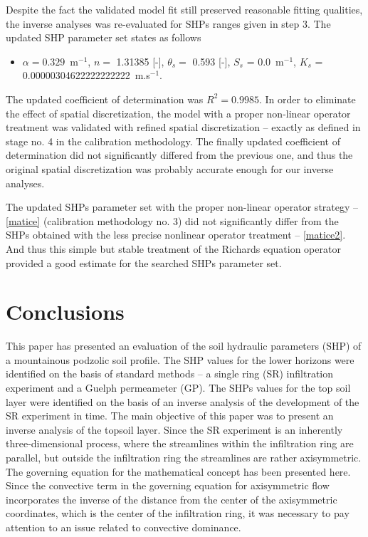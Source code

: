 \documentclass[review]{myarticle}
\begin{document}
Despite the fact the validated model fit still preserved reasonable fitting qualities, the inverse analyses was re-evaluated for SHPs ranges given in step 3. The updated SHP parameter set states as follows
\begin{itemize}
\item  $\alpha= 0.329$~m$^{-1}$, $n=$            1.31385 [-],  $\theta_s=$  0.593 [-], $S_s$ = 0.0~m$^{-1}$, $K_s$ = \num{.00000304622222222222}~m.s$^{-1}$.
\end{itemize}
The updated coefficient of determination was $R^2=0.9985$. In order to eliminate the effect of spatial discretization, the model with a proper non-linear operator treatment was validated with refined spatial discretization -- exactly as defined in stage no. 4 in the calibration methodology. The finally updated coefficient of determination did not significantly differed from the previous one, and thus the original spatial discretization was probably accurate enough for our inverse analyses.

The updated SHPs parameter set with the proper non-linear operator strategy  -- \eqref{matice} (calibration methodology no. 3)  did not significantly differ from the SHPs obtained with the less precise nonlinear operator treatment -- \eqref{matice2}. And thus this simple but  stable treatment  of the Richards equation operator provided a good estimate for the searched SHPs parameter set.

\section{Conclusions} %

This paper has presented an evaluation of the soil hydraulic parameters (SHP) of a mountainous podzolic soil profile. The SHP values for the lower horizons were identified on the basis of standard methods -- a single ring (SR) infiltration experiment and a Guelph permeameter (GP). The SHPs values for the top soil layer were identified on the basis of an inverse analysis of the development of the SR experiment in time. The main objective of this paper was to present an inverse analysis of the topsoil layer.  Since the SR experiment is an inherently three-dimensional process, where the streamlines within the infiltration ring are parallel, but outside the infiltration ring the streamlines are rather axisymmetric. The governing equation for the mathematical concept has been presented here. Since the convective term in the governing equation for axisymmetric flow incorporates the inverse of the distance from the center of the axisymmetric coordinates, which is the center of the infiltration ring, it was necessary to pay attention to an issue related to convective dominance.
\end{document}
